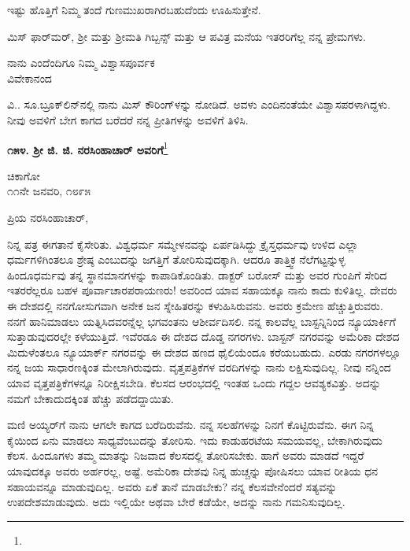 ಇಷ್ಟು ಹೊತ್ತಿಗೆ ನಿಮ್ಮ ತಂದೆ ಗುಣಮುಖರಾಗಿರಬಹುದೆಂದು ಊಹಿಸುತ್ತೇನೆ.

ಮಿಸ್‌ ಫಾರ್‌ಮರ್, ಶ‍್ರೀ ಮತ್ತು ಶ‍್ರೀಮತಿ ಗಿಬ್ಬನ್ಸ್ ಮತ್ತು ಆ ಪವಿತ್ರ ಮನೆಯ ಇತರರಿಗೆಲ್ಲ ನನ್ನ ಪ್ರೇಮಗಳು.

\vspace{-0.3cm}

\begin{flushright}
ನಾನು ಎಂದೆಂದಿಗೂ ನಿಮ್ಮ ವಿಶ್ವಾಸಪೂರ್ವಕ\\ವಿವೇಕಾನಂದ
\end{flushright}

ವಿ.. ಸೂ.\enginline{-}ಬ್ರೂಕ್‌ಲಿನ್‌ನಲ್ಲಿ ನಾನು ಮಿಸ್ ಕೌರಿಂಗ್‌ಳನ್ನು ನೋಡಿದೆ. ಅವಳು ಎಂದಿನಂತೆಯೇ ವಿಶ್ವಾಸಪರಳಾಗಿದ್ದಳು. ನೀವು ಅವಳಿಗೆ ಬೇಗ ಕಾಗದ ಬರೆದರೆ ನನ್ನ ಪ್ರೀತಿಗಳನ್ನು ಅವಳಿಗೆ ತಿಳಿಸಿ.

\vspace{-0.2cm}

\begin{center}
\textbf{೧೫೪. ಶ‍್ರೀ ಜಿ. ಜಿ. ನರಸಿಂಹಾಚಾರ್ ಅವರಿಗೆ}\footnote{}
\end{center}

\vspace{-0.3cm}

\begin{flushright}
ಚಿಕಾಗೋ\\೧೧ನೇ ಜನವರಿ, ೧೮೯೫
\end{flushright}

\noindent
ಪ್ರಿಯ ನರಸಿಂಹಾಚಾರ್,

ನಿನ್ನ ಪತ್ರ ಈಗತಾನೆ ಕೈಸೇರಿತು. ವಿಶ್ವಧರ್ಮ ಸಮ್ಮೇಳನವನ್ನು ಏರ್ಪಡಿಸಿದ್ದು ಕ್ರೈಸ್ತಧರ್ಮವು ಉಳಿದ ಎಲ್ಲಾ ಧರ್ಮಗಳಿಗಿಂತಲೂ ಶ್ರೇಷ್ಠ ಎಂಬುದನ್ನು ಜಗತ್ತಿಗೆ ತೋರಿಸುವುದಕ್ಕಾಗಿ. ಆದರೂ ತಾತ್ತ್ವಿಕ ನೆಲೆಗಟ್ಟನ್ನುಳ್ಳ ಹಿಂದೂಧರ್ಮವು ತನ್ನ ಸ್ಥಾನಮಾನಗಳನ್ನು ಕಾಪಾಡಿಕೊಂಡಿತು. ಡಾಕ್ಟರ್ ಬರೋಸ್ ಮತ್ತು ಅವರ ಗುಂಪಿಗೆ ಸೇರಿದ ಇತರರೆಲ್ಲರೂ ಬಹಳ ಪೂರ್ವಾಚಾರಪರಾಯಣರು! ಅವರಿಂದ ಯಾವ ಸಹಾಯಕ್ಕೂ ನಾನು ಕಾದು ಕುಳಿತಿಲ್ಲ. ದೇವರು ಈ ದೇಶದಲ್ಲಿ ನನಗೋಸುಗವಾಗಿ ಅನೇಕ ಜನ ಸ್ನೇಹಿತರನ್ನು ಕಳುಹಿಸಿರುವನು. ಅವರು ಕ್ರಮೇಣ ಹೆಚ್ಚುತ್ತಿರುವರು. ನನಗೆ ಹಾನಿಮಾಡಲು ಯತ್ನಿಸಿದವರನ್ನೆಲ್ಲ ಭಗವಂತನು ಆಶೀರ್ವದಿಸಲಿ. ನನ್ನ ಕಾಲವೆಲ್ಲ ಬಾಸ್ಟನ್ನಿನಿಂದ ನ್ಯೂಯಾರ್ಕಿಗೆ ಸುತ್ತಾಡುವುದರಲ್ಲೇ ಕಳೆಯುತ್ತಿದೆ. ಇವೆರಡೂ ಈ ದೇಶದ ದೊಡ್ಡ ನಗರಗಳು. ಬಾಸ್ಟನ್ ನಗರವನ್ನು ಅಮೆರಿಕಾ ದೇಶದ ಮಿದುಳೆಂತಲೂ ನ್ಯೂಯಾರ್ಕ್ ನಗರವನ್ನು ಈ ದೇಶದ ಹಣದ ಥೈಲಿಯೆಂದೂ ಕರೆಯಬಹುದು. ಎರಡು ನಗರಗಳಲ್ಲೂ ನನ್ನ ಜಯ ಸಾಧಾರಣಕ್ಕಿಂತ ಮೇಲಾಗಿರುವುದು. ವೃತ್ತಪತ್ರಿಕೆಗಳ ವರದಿಗಳನ್ನು ನಾನು ಲಕ್ಷಿಸುವುದಿಲ್ಲ. ನೀವು ನನ್ನಿಂದ ಯಾವ ವೃತ್ತಪತ್ರಿಕೆಗಳನ್ನೂ ನಿರೀಕ್ಷಿಸಬೇಡಿ. ಕೆಲಸದ ಆರಂಭದಲ್ಲಿ ಇಂತಹ ಒಂದು ಗದ್ದಲ ಆವಶ್ಯಕವಿತ್ತು. ಅದನ್ನು ನಮಗೆ ಬೇಕಾದುದಕ್ಕಿಂತ ಹೆಚ್ಚು ಪಡೆದದ್ದಾಯಿತು.
\vspace{0.4cm}

ಮಣಿ ಅಯ್ಯರ್‌ಗೆ ನಾನು ಆಗಲೇ ಕಾಗದ ಬರೆದಿರುವೆನು. ನನ್ನ ಸಲಹೆಗಳನ್ನು ನಿನಗೆ ಕೊಟ್ಟಿರುವೆನು. ಈಗ ನಿನ್ನ ಕೈಯಿಂದ ಏನು ಮಾಡಲು ಸಾಧ್ಯವೆಂಬುದನ್ನು ತೋರಿಸು. ಇದು ಕಾಡುಹರಟೆಯ ಸಮಯವಲ್ಲ, ಬೇಕಾಗಿರುವುದು ಕೆಲಸ. ಹಿಂದೂಗಳು ತಮ್ಮ ಮಾತನ್ನು ನಿಜವಾದ ಕೆಲಸದಲ್ಲಿ ತೋರಿಸಬೇಕು. ಹಾಗೆ ಅವರು ಮಾಡದೆ ಇದ್ದರೆ ಯಾವುದಕ್ಕೂ ಅವರು ಅರ್ಹರಲ್ಲ, ಅಷ್ಟೆ. ಅಮೆರಿಕಾ ದೇಶವು ನಿನ್ನ ಹುಚ್ಚನ್ನು ಪೋಷಿಸಲು ಯಾವ ರೀತಿಯ ಧನ ಸಹಾಯವನ್ನೂ ಮಾಡುವುದಿಲ್ಲ. ಅವರು ಏಕೆ ತಾನೆ ಮಾಡಬೇಕು? ನನ್ನ ಕೆಲಸವೇನೆಂದರೆ ಸತ್ಯವನ್ನು ಉಪದೇಶಮಾಡುವುದು. ಅದು ಇಲ್ಲಿಯೇ ಅಥವಾ ಬೇರೆ ಕಡೆಯೇ, ಅದನ್ನು ನಾನು ಗಮನಿಸುವುದಿಲ್ಲ.
\vspace{0.4cm}

